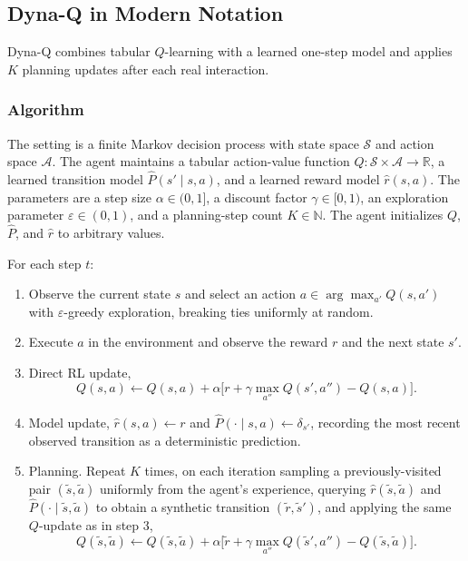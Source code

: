 \subsection{Dyna-Q in Modern Notation}
\label{section:fc_dyna_q}

Dyna-Q combines tabular $Q$-learning with a learned one-step model and applies $K$ planning updates after each real interaction.

\subsubsection{Algorithm}
\label{section:fc_dyna_q_algorithm}

The setting is a finite Markov decision process with state space $\mathcal{S}$ and action space $\mathcal{A}$. The agent maintains a tabular action-value function $Q : \mathcal{S} \times \mathcal{A} \to \mathbb{R}$, a learned transition model $\widehat P(s' \mid s, a)$, and a learned reward model $\widehat r(s, a)$. The parameters are a step size $\alpha \in (0, 1]$, a discount factor $\gamma \in [0, 1)$, an exploration parameter $\varepsilon \in (0, 1)$, and a planning-step count $K \in \mathbb{N}$. The agent initializes $Q$, $\widehat P$, and $\widehat r$ to arbitrary values.

For each step $t$:
\begin{enumerate}
  \item Observe the current state $s$ and select an action $a \in \arg\max_{a'} Q(s, a')$ with $\varepsilon$-greedy exploration, breaking ties uniformly at random.
  \item Execute $a$ in the environment and observe the reward $r$ and the next state $s'$.
  \item Direct RL update,
        \[ Q(s, a) \leftarrow Q(s, a) + \alpha \big[ r + \gamma \max_{a''} Q(s', a'') - Q(s, a) \big]. \]
  \item Model update, $\widehat r(s, a) \leftarrow r$ and $\widehat P(\cdot \mid s, a) \leftarrow \delta_{s'}$, recording the most recent observed transition as a deterministic prediction.
  \item Planning. Repeat $K$ times, on each iteration sampling a previously-visited pair $(\tilde s, \tilde a)$ uniformly from the agent's experience, querying $\widehat r(\tilde s, \tilde a)$ and $\widehat P(\cdot \mid \tilde s, \tilde a)$ to obtain a synthetic transition $(\tilde r, \tilde s')$, and applying the same $Q$-update as in step 3,
        \[ Q(\tilde s, \tilde a) \leftarrow Q(\tilde s, \tilde a) + \alpha \big[ \tilde r + \gamma \max_{a''} Q(\tilde s', a'') - Q(\tilde s, \tilde a) \big]. \]
\end{enumerate}

